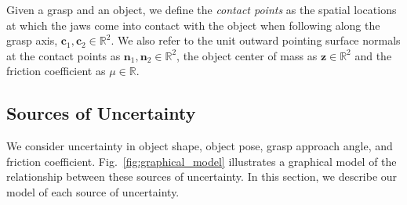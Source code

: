 \documentclass[10pt, conference]{ieeeconf}      %
\newcommand{\bc}{\mathbf{c}}
\newcommand{\bn}{\mathbf{n}}
\newcommand{\bz}{\mathbf{z}}
\begin{document}

Given a grasp and an object, we define the {\it contact points} as the spatial locations at which the jaws come into contact with the object when following along the grasp axis, $\bc_1, \bc_2 \in \mathbb{R}^2$.
We also refer to the unit outward pointing surface normals at the contact points as $\bn_1, \bn_2 \in \mathbb{R}^2$, the object center of mass as $\bz \in \mathbb{R}^2$ and the friction coefficient as $\mu \in \mathbb{R}$.




\subsection{Sources of Uncertainty}
We consider uncertainty in object shape, object pose, grasp approach angle, and friction coefficient.
Fig.~\ref{fig:graphical_model} illustrates a graphical model of the relationship between these sources of uncertainty.
In this section, we describe our model of each source of uncertainty.
\end{document}
